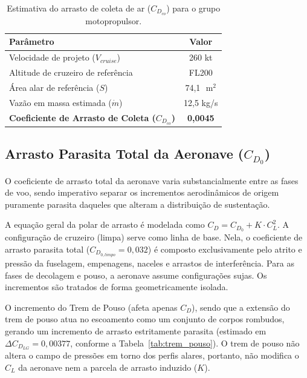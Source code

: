 \begin{table}[H]
    \centering
    \caption{Estimativa do arrasto de coleta de ar ($C_{D_{co}}$) para o grupo motopropulsor.}
    \vspace{0.2cm}
    \begin{tabular}{lc}
        \toprule
        \textbf{Parâmetro} & \textbf{Valor} \\
        \midrule
        Velocidade de projeto ($V_{cruise}$) & 260 kt \\
        Altitude de cruzeiro de referência & FL200 \\
        Área alar de referência ($S$) & 74,1 $\text{ m}^2$ \\
        Vazão em massa estimada ($\dot{m}$) & 12,5 kg/s \\
        \midrule
        \textbf{Coeficiente de Arrasto de Coleta ($C_{D_{co}}$)} & \textbf{0,0045} \\
        \bottomrule
    \end{tabular}
    \label{tab:arrasto_coleta}
\end{table}

\subsection{Arrasto Parasita Total da Aeronave ($C_{D_0}$)}

O coeficiente de arrasto total da aeronave varia substancialmente entre as fases de voo, sendo imperativo separar os incrementos aerodinâmicos de origem puramente parasita daqueles que alteram a distribuição de sustentação. 

A equação geral da polar de arrasto é modelada como $C_D = C_{D_0} + K \cdot C_L^2$. A configuração de cruzeiro (limpa) serve como linha de base. Nela, o coeficiente de arrasto parasita total ($C_{D_{0,limpo}} = 0,032$) é composto exclusivamente pelo atrito e pressão da fuselagem, empenagens, naceles e arrastos de interferência. Para as fases de decolagem e pouso, a aeronave assume configurações sujas. Os incrementos são tratados de forma geometricamente isolada.

O incremento do Trem de Pouso (afeta apenas $C_D$), sendo que a extensão do trem de pouso atua no escoamento como um conjunto de corpos rombudos, gerando um incremento de arrasto estritamente parasita (estimado em $\Delta C_{D_{LG}} = 0,00377$, conforme a Tabela~\ref{tab:trem_pouso}). O trem de pouso não altera o campo de pressões em torno dos perfis alares, portanto, não modifica o $C_L$ da aeronave nem a parcela de arrasto induzido ($K$).

